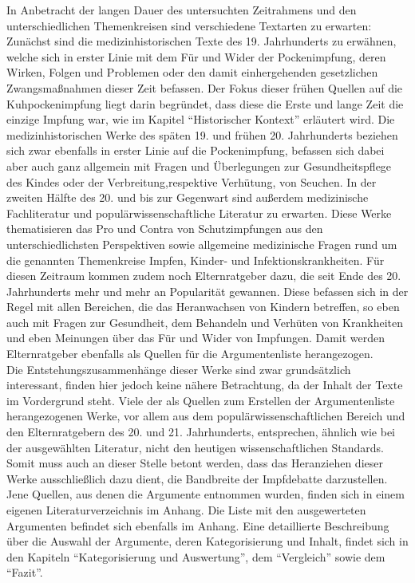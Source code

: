 \documentclass[
    a4paper,
    12pt,
    hyphens,
    chapterprefix=true,
    headheight=33pt,
    footheight=29pt,
    headings=optiontohead,
]{scrartcl}
\begin{document}
In Anbetracht der langen Dauer des untersuchten Zeitrahmens und den unterschiedlichen Themenkreisen sind verschiedene Textarten zu erwarten: Zunächst sind die medizinhistorischen Texte des 19. Jahrhunderts zu erwähnen, welche sich in erster Linie mit dem Für und Wider der Pockenimpfung, deren Wirken, Folgen und Problemen oder den damit einhergehenden gesetzlichen Zwangsmaßnahmen dieser Zeit befassen. Der Fokus dieser frühen Quellen auf die Kuhpockenimpfung liegt darin begründet, dass diese die Erste und lange Zeit die einzige Impfung war, wie im Kapitel "`Historischer Kontext"' erläutert wird. Die medizinhistorischen Werke des späten 19. und frühen 20. Jahrhunderts beziehen sich zwar ebenfalls in erster Linie auf die Pockenimpfung, befassen sich dabei aber auch ganz allgemein mit Fragen und Überlegungen zur Gesundheitspflege des Kindes oder der Verbreitung,respektive Verhütung, von Seuchen. In der zweiten Hälfte des 20. und bis zur Gegenwart sind außerdem medizinische Fachliteratur und populärwissenschaftliche Literatur zu erwarten. Diese Werke thematisieren das Pro und Contra von Schutzimpfungen aus den unterschiedlichsten Perspektiven sowie allgemeine medizinische Fragen rund um die genannten Themenkreise Impfen, Kinder- und Infektionskrankheiten. Für diesen Zeitraum kommen zudem noch Elternratgeber dazu, die seit Ende des 20. Jahrhunderts mehr und mehr an Popularität gewannen. Diese befassen sich in der Regel mit allen Bereichen, die das Heranwachsen von Kindern betreffen, so eben auch mit Fragen zur Gesundheit, dem Behandeln und Verhüten von Krankheiten und eben Meinungen über das Für und Wider von Impfungen. Damit werden Elternratgeber ebenfalls als Quellen für die Argumentenliste herangezogen.\\
Die Entstehungszusammenhänge dieser Werke sind zwar grundsätzlich interessant, finden hier jedoch keine nähere Betrachtung, da der Inhalt der Texte im Vordergrund steht. Viele der als Quellen zum Erstellen der Argumentenliste herangezogenen Werke, vor allem aus dem populärwissenschaftlichen Bereich und den Elternratgebern des 20. und 21. Jahrhunderts, entsprechen, ähnlich wie bei der ausgewählten Literatur, nicht den heutigen wissenschaftlichen Standards. Somit muss auch an dieser Stelle betont werden, dass das Heranziehen dieser Werke ausschließlich dazu dient, die Bandbreite der Impfdebatte darzustellen.\\
Jene Quellen, aus denen die Argumente entnommen wurden, finden sich in einem eigenen Literaturverzeichnis im Anhang. Die Liste mit den ausgewerteten Argumenten befindet sich ebenfalls im Anhang. Eine detaillierte Beschreibung über die Auswahl der Argumente, deren Kategorisierung und Inhalt, findet sich in den Kapiteln "`Kategorisierung und Auswertung"', dem "`Vergleich"' sowie dem "`Fazit"'.
\end{document}
